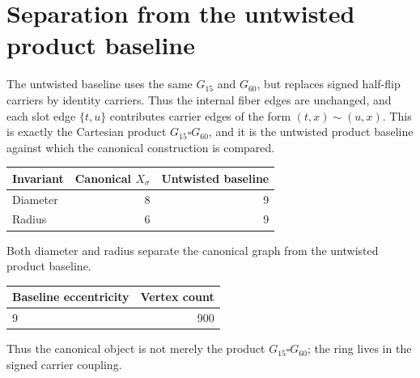 \section{Separation from the untwisted product baseline}

The untwisted baseline uses the same \(G_{15}\) and \(G_{60}\), but replaces signed half-flip carriers by identity carriers. Thus the internal fiber edges are unchanged, and each slot edge \(\{t,u\}\) contributes carrier edges of the form \((t,x)\sim(u,x)\). This is exactly the Cartesian product \(G_{15}\square G_{60}\), and it is the untwisted product baseline against which the canonical construction is compared.

\begin{center}
\begin{tabular}{lrr}
\toprule
Invariant & Canonical \(X_\sigma\) & Untwisted baseline \\
\midrule
Diameter & 8 & 9 \\
Radius & 6 & 9 \\
\bottomrule
\end{tabular}
\end{center}

Both diameter and radius separate the canonical graph from the untwisted product baseline.

\begin{center}
\begin{tabular}{lr}
\toprule
Baseline eccentricity & Vertex count \\
\midrule
9 & 900 \\
\bottomrule
\end{tabular}
\end{center}

Thus the canonical object is not merely the product \(G_{15}\square G_{60}\); the ring lives in the signed carrier coupling.

